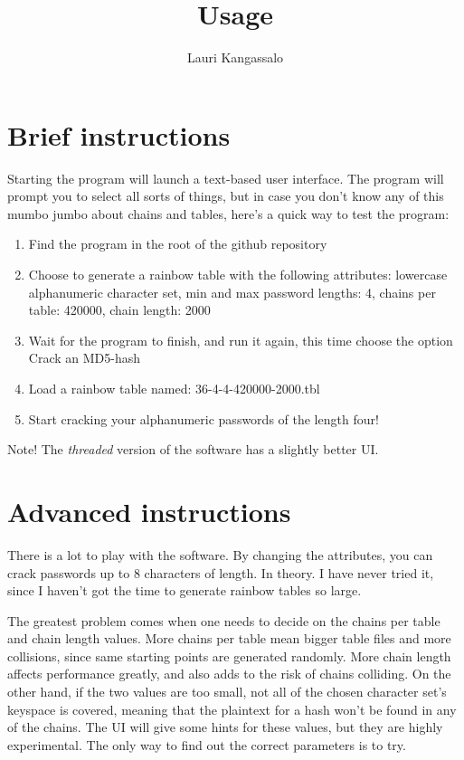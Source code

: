 \documentclass[a4paper, 11pt, finnish]{article}
\title{Usage}
\author{Lauri Kangassalo}
\begin{document}
  \maketitle

\section*{Brief instructions}
Starting the program will launch a text-based user interface. The program will prompt you to select all sorts of things, but in case you don't know any of this mumbo jumbo about chains and tables, here's a quick way to test the program:
\begin{enumerate}
\item Find the program in the root of the github repository
\item Choose to generate a rainbow table with the following attributes: lowercase alphanumeric character set, min and max password lengths: 4, chains per table: 420000, chain length: 2000
\item Wait for the program to finish, and run it again, this time choose the option Crack an MD5-hash
\item Load a rainbow table named: 36-4-4-420000-2000.tbl
\item Start cracking your alphanumeric passwords of the length four!
\end{enumerate}

Note! The \emph{threaded} version of the software has a slightly better UI.

\section*{Advanced instructions}
There is a lot to play with the software. By changing the attributes, you can crack passwords up to 8 characters of length. In theory. I have never tried it, since I haven't got the time to generate rainbow tables so large.

The greatest problem comes when one needs to decide on the chains per table and chain length values. More chains per table mean bigger table files and more collisions, since same starting points are generated randomly. More chain length affects performance greatly, and also adds to the risk of chains colliding. On the other hand, if the two values are too small, not all of the chosen character set's keyspace is covered, meaning that the plaintext for a hash won't be found in any of the chains. The UI will give some hints for these values, but they are highly experimental. The only way to find out the correct parameters is to try.
\end{document}
